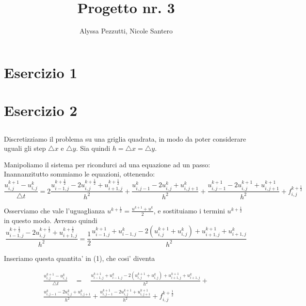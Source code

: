 \documentclass[]{article}
\title{Progetto nr. 3}
\author{Alyssa Pezzutti, Nicole Santero}
\date{}
\begin{document}
\maketitle

\section{Esercizio 1}

\section{Esercizio 2}

\subsection{}
Discretizziamo il problema su una griglia quadrata, in modo da poter considerare uguali gli step $\bigtriangleup x$ e $\bigtriangleup y$. Sia quindi $h = \bigtriangleup x = \bigtriangleup y $.

Manipoliamo il sistema per ricondurci ad una equazione ad un passo:
Inannanzitutto sommiamo le equazioni, ottenendo:
\begin{equation}
	\frac{u^{k+1}_{i,j}-u^k_{i,j}}{\bigtriangleup t} = 2 \frac{u^{k+\frac{1}{2}}_{i-1,j} -2u^{k+\frac{1}{2}}_{i,j} + u^{k+\frac{1}{2}}_{i+1,j}}{h^2} + \frac{u^{k}_{i,j-1} -2u^{k}_{i,j} + u^{k}_{i,j+1}}{h^2} + \frac{u^{k+1}_{i,j-1} -2u^{k+1}_{i,j} + u^{k+1}_{i,j+1}}{h^2} + f^{k+\frac{1}{2}}_{i,j}
\end{equation}

Osserviamo che vale l'uguaglianza $u^{k+\frac{1}{2}} = \frac{ u^{k+1}+ u^{k}}{2}$, e sostituiamo i termini $u^{k+\frac{1}{2}}$ in questo modo. Avremo quindi
\begin{equation}
\frac{u^{k+\frac{1}{2}}_{i-1,j} -2u^{k+\frac{1}{2}}_{i,j} + u^{k+\frac{1}{2}}_{i+1,j}}{h^2} = \frac{1}{2} \frac{u^{k+1}_{i-1,j} + u^{k}_{i-1,j} - 2(u^{k+1}_{i,j} + u^{k}_{i,j}) + u^{k+1}_{i+1,j} + u^{k}_{i+1,j}}{h^2}
\end{equation}

Inseriamo questa quantita' in (1), che cosi' diventa

\begin{equation}
\begin{split}
\frac{u^{k+1}_{i,j}-u^k_{i,j}}{\bigtriangleup t} \quad = \quad  \frac{u^{k+1}_{i-1,j} + u^{k}_{i-1,j} - 2(u^{k+1}_{i,j} + u^{k}_{i,j}) + u^{k+1}_{i+1,j} + u^{k}_{i+1,j}}{h^2} +\\ \frac{u^{k}_{i,j-1} -2u^{k}_{i,j} + u^{k}_{i,j+1}}{h^2} + \frac{u^{k+1}_{i,j-1} -2u^{k+1}_{i,j} + u^{k+1}_{i,j+1}}{h^2} + f^{k+\frac{1}{2}}_{i,j}
\end{split}
\end{equation}
\end{document}
